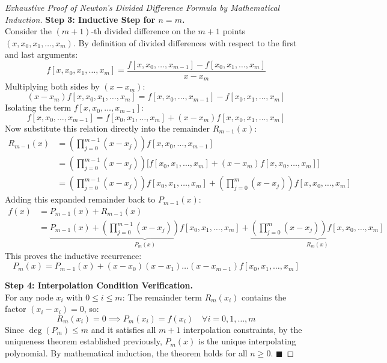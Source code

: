 \begin{proof}[Exhaustive Proof of Newton's Divided Difference Formula by Mathematical Induction]
\medskip
\noindent\textbf{Step 3: Inductive Step for $n = m$.} \\
Consider the $(m+1)$-th divided difference on the $m+1$ points $(x, x_0, x_1, \dots, x_m)$. By definition of divided differences with respect to the first and last arguments:
\begin{equation}
    f[x, x_0, x_1, \dots, x_m] = \frac{f[x, x_0, \dots, x_{m-1}] - f[x_0, x_1, \dots, x_m]}{x - x_m}
\end{equation}
Multiplying both sides by $(x - x_m)$:
\begin{equation}
    (x - x_m) f[x, x_0, x_1, \dots, x_m] = f[x, x_0, \dots, x_{m-1}] - f[x_0, x_1, \dots, x_m]
\end{equation}
Isolating the term $f[x, x_0, \dots, x_{m-1}]$:
\begin{equation}
    f[x, x_0, \dots, x_{m-1}] = f[x_0, x_1, \dots, x_m] + (x - x_m) f[x, x_0, x_1, \dots, x_m]
\end{equation}
Now substitute this relation directly into the remainder $R_{m-1}(x)$:
\begin{align}
    R_{m-1}(x) &= \left( \prod_{j=0}^{m-1} (x - x_j) \right) f[x, x_0, \dots, x_{m-1}] \nonumber \\
    &= \left( \prod_{j=0}^{m-1} (x - x_j) \right) \Big[ f[x_0, x_1, \dots, x_m] + (x - x_m) f[x, x_0, \dots, x_m] \Big] \nonumber \\
    &= \left( \prod_{j=0}^{m-1} (x - x_j) \right) f[x_0, x_1, \dots, x_m] + \left( \prod_{j=0}^m (x - x_j) \right) f[x, x_0, \dots, x_m]
\end{align}
Adding this expanded remainder back to $P_{m-1}(x)$:
\begin{align}
    f(x) &= P_{m-1}(x) + R_{m-1}(x) \nonumber \\
    &= \underbrace{P_{m-1}(x) + \left( \prod_{j=0}^{m-1} (x - x_j) \right) f[x_0, x_1, \dots, x_m]}_{P_m(x)} + \underbrace{\left( \prod_{j=0}^m (x - x_j) \right) f[x, x_0, \dots, x_m]}_{R_m(x)}
\end{align}
This proves the inductive recurrence:
\begin{equation}
    \boxed{P_m(x) = P_{m-1}(x) + (x - x_0)(x - x_1)\dots(x - x_{m-1}) f[x_0, x_1, \dots, x_m]}
\end{equation}

\medskip
\noindent\textbf{Step 4: Interpolation Condition Verification.} \\
For any node $x_i$ with $0 \le i \le m$:
The remainder term $R_m(x_i)$ contains the factor $(x_i - x_i) = 0$, so:
\begin{equation}
    R_m(x_i) = 0 \implies P_m(x_i) = f(x_i) \quad \forall i = 0, 1, \dots, m
\end{equation}
Since $\deg(P_m) \le m$ and it satisfies all $m+1$ interpolation constraints, by the uniqueness theorem established previously, $P_m(x)$ is the unique interpolating polynomial.
By mathematical induction, the theorem holds for all $n \ge 0$. $\blacksquare$
\end{proof}

